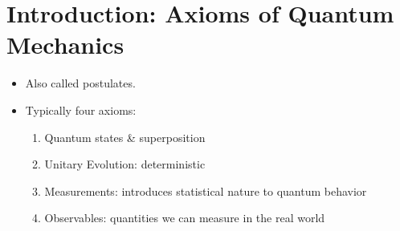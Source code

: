 \section{Introduction: Axioms of Quantum Mechanics}
\begin{itemize}
	\item Also called postulates.
	\item Typically four axioms:
		\begin{enumerate}[label=\arabic*.]
			\item Quantum states \& superposition
			\item Unitary Evolution: deterministic
			\item Measurements: introduces statistical nature to quantum behavior
			\item Observables: quantities we can measure in the real world 
		\end{enumerate}
\end{itemize}

